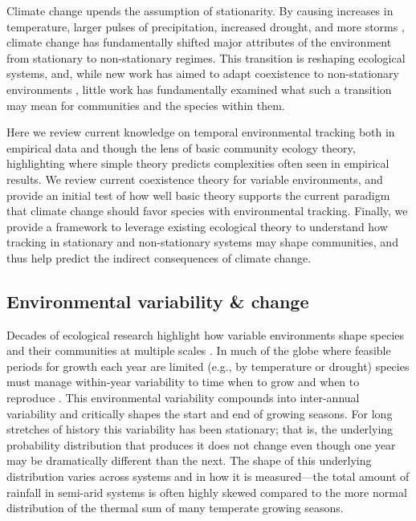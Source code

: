 \documentclass[11pt,letterpaper]{article}
\begin{document}
Climate change upends the assumption of stationarity. By causing increases in temperature, larger pulses of precipitation, increased drought, and more storms \citep{ipcc2013}, climate change has fundamentally shifted major attributes of the environment from stationary to non-stationary regimes. This transition is reshaping ecological systems, and, while new work has aimed to adapt coexistence to non-stationary environments \citep{chessonnonstat}, little work has fundamentally examined what such a transition may mean for communities and the species within them.  %

Here we review current knowledge on temporal environmental tracking both in empirical data and though the lens of basic community ecology theory, highlighting where simple theory predicts complexities often seen in empirical results. We review current coexistence theory for variable environments, and provide an initial test of how well basic theory supports the current paradigm that climate change should favor species with environmental tracking. Finally, we provide a framework to leverage existing ecological theory to understand how tracking in stationary and non-stationary systems may shape communities, and thus help predict the indirect consequences of climate change. %

\subsection{Environmental variability \& change}

Decades of ecological research highlight how variable environments shape species and their communities at multiple scales \citep{Sale:1977oq,Chesson:1997dz}.  In much of the globe where feasible periods for growth each year are limited (e.g., by temperature or drought) species must manage within-year variability to time when to grow and when to reproduce \citep{donohue2002}. This environmental variability compounds into inter-annual variability and critically shapes the start and end of growing seasons. For long stretches of history this variability has been stationary; that is, the underlying probability distribution that produces it does not change even though one year may be dramatically different than the next. The shape of this underlying distribution varies across systems and in how it is measured---the total amount of rainfall in semi-arid systems is often highly skewed compared to the more normal distribution of the thermal sum of many temperate growing seasons.
\end{document}
